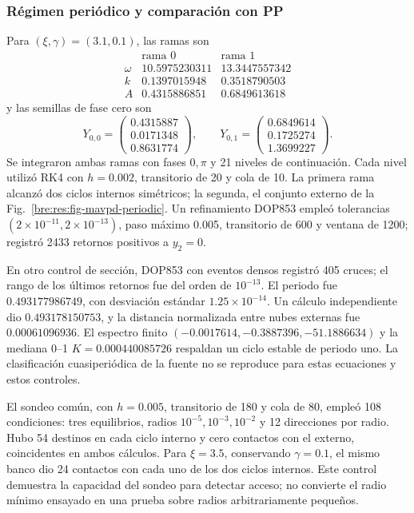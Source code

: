 \subsubsection{Régimen periódico y comparación con PP}
Para \((\xi,\gamma)=(3.1,0.1)\), las ramas son
\[
 \begin{array}{c|rr}
 &\text{rama 0}&\text{rama 1}\\\hline
 \omega&10.5975230311&13.3447557342\\
 k&0.1397015948&0.3518790503\\
 A&0.4315886851&0.6849613618
 \end{array}
\]
y las semillas de fase cero son
\[
 Y_{0,0}=\begin{pmatrix}0.4315887\\0.0171348\\0.8631774\end{pmatrix},
 \qquad Y_{0,1}=\begin{pmatrix}0.6849614\\0.1725274\\1.3699227\end{pmatrix}.
\]
Se integraron ambas ramas con fases
\(0,\pi\) y 21 niveles de continuación. Cada nivel utilizó RK4 con
\(h=0.002\), transitorio de 20 y cola de 10. La primera rama alcanzó dos
ciclos internos simétricos; la segunda, el conjunto externo de la
Fig.~\ref{bre:res:fig-mavpd-periodic}. Un refinamiento DOP853 empleó
tolerancias \((2\times10^{-11},2\times10^{-13})\), paso máximo 0.005,
transitorio de 600 y ventana de 1200; registró 2433 retornos positivos a
\(y_2=0\).

En otro control de sección, DOP853 con eventos densos registró 405
cruces; el rango de los últimos retornos fue del orden de \(10^{-13}\).
El periodo fue \(0.493177986749\), con desviación estándar
\(1.25\times10^{-14}\). Un cálculo independiente dio
\(0.493178150753\), y la distancia normalizada entre nubes externas fue
\(0.00061096936\). El espectro finito
\((-0.0017614,-0.3887396,-51.1886634)\) y la mediana 0--1
\(K=0.000440085726\) respaldan un ciclo estable de periodo uno. La
clasificación cuasiperiódica de la fuente no se reproduce para estas
ecuaciones y estos controles.

El sondeo común, con \(h=0.005\), transitorio de 180 y cola de 80, empleó
108 condiciones: tres equilibrios, radios \(10^{-5},10^{-3},10^{-2}\) y
12 direcciones por radio. Hubo 54 destinos en cada ciclo interno y cero
contactos con el externo, coincidentes en ambos cálculos. Para
\(\xi=3.5\), conservando \(\gamma=0.1\), el mismo banco dio 24 contactos
con cada uno de los dos ciclos internos. Este control demuestra la
capacidad del sondeo para detectar acceso; no convierte el radio mínimo
ensayado en una prueba sobre radios arbitrariamente pequeños.

